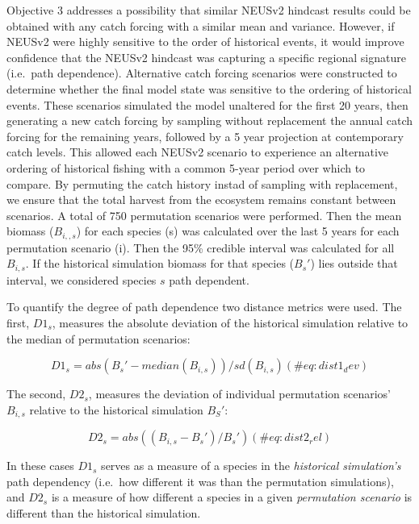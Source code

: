 \documentclass[
]{article}
\begin{document}
Objective 3 addresses a possibility that similar NEUSv2 hindcast results could be obtained with any catch forcing with a similar mean and variance. However, if NEUSv2 were highly sensitive to the order of historical events, it would improve confidence that the NEUSv2 hindcast was capturing a specific regional signature (i.e.~path dependence). Alternative catch forcing scenarios were constructed to determine whether the final model state was sensitive to the ordering of historical events. These scenarios simulated the model unaltered for the first 20 years, then generating a new catch forcing by sampling without replacement the annual catch forcing for the remaining years, followed by a 5 year projection at contemporary catch levels. This allowed each NEUSv2 scenario to experience an alternative ordering of historical fishing with a common 5-year period over which to compare. By permuting the catch history instad of sampling with replacement, we ensure that the total harvest from the ecosystem remains constant between scenarios. A total of 750 permutation scenarios were performed. Then the mean biomass (\(B_{i,,s}\)) for each species (s) was calculated over the last 5 years for each permutation scenario (i). Then the 95\% credible interval was calculated for all \(B_{i,s}\). If the historical simulation biomass for that species (\(B_{s}'\)) lies outside that interval, we considered species \(s\) path dependent.

To quantify the degree of path dependence two distance metrics were used. The first, \(D1_s\), measures the absolute deviation of the historical simulation relative to the median of permutation scenarios:

\begin{equation}
  D1_s = abs(B_{s}' - median(B_{i,s}))/sd(B_{i,s})
  (\#eq:dist1_dev)
\end{equation}

The second, \(D2_s\), measures the deviation of individual permutation scenarios' \(B_{i,s}\) relative to the historical simulation \(B_{S}'\):

\begin{equation}
  D2_s = abs((B_{i,s} - B_{s}')/B_{s}')
  (\#eq:dist2_rel)
\end{equation}

In these cases \(D1_s\) serves as a measure of a species in the \emph{historical simulation's} path dependency (i.e.~how different it was than the permutation simulations), and \(D2_s\) is a measure of how different a species in a given \emph{permutation scenario} is different than the historical simulation.
\end{document}
